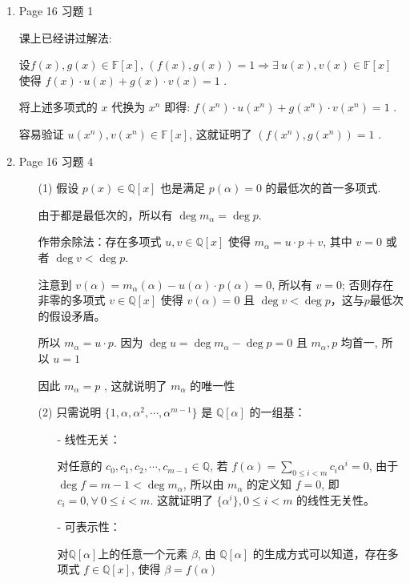 \documentclass{article}
\begin{document}
\begin{spacing}{1.5}
\begin{enumerate}
    \item Page 16 习题 1
    
    课上已经讲过解法: 

    设$f(x), g(x)\in\mathbb{F}[x]$, $(f(x), g(x)) = 1 \Rightarrow \exists\ u(x), v(x)\in\mathbb{F}[x]$ 使得
    $f(x)\cdot u(x) + g(x)\cdot v(x) = 1$ .
    
    将上述多项式的 $x$ 代换为 $x^n$ 即得: $f(x^n)\cdot u(x^n) + g(x^n)\cdot v(x^n) = 1$ .

    容易验证 $u(x^n), v(x^n)\in\mathbb{F}[x]$, 这就证明了 $(f(x^n), g(x^n)) = 1$ .

    \item Page 16 习题 4
    
    \begin{enumerate}
        \item [(1)] 假设 $p(x)\in\mathbb{Q}[x]$ 也是满足 $p(\alpha)=0$ 的最低次的首一多项式.
        
        由于都是最低次的，所以有 $\deg m_\alpha = \deg p$. 
        
        作带余除法：存在多项式 $u, v\in\mathbb{Q}[x]$ 使得 $m_\alpha = u\cdot p + v$,  其中 $v=0$ 或者 $\deg v < \deg p$.

        注意到 $v(\alpha) = m_\alpha(\alpha) - u(\alpha)\cdot p(\alpha) = 0$, 所以有 $v=0$; 否则存在非零的多项式 $v\in\mathbb{Q}[x]$ 使得 $v(\alpha)=0$ 且 $\deg v < \deg p$，这与$p$最低次的假设矛盾。 

        所以 $m_\alpha = u\cdot p$. 因为 $\deg u = \deg m_\alpha - \deg p = 0$ 且 $m_\alpha, p$ 均首一, 所以 $u=1$
        
        因此 $m_\alpha = p$ , 这就说明了 $m_\alpha$ 的唯一性

        \item [(2)] 只需说明 $\{1,\alpha, \alpha^2, \cdots, \alpha^{m-1}\}$ 是 $\mathbb{Q}[\alpha]$ 的一组基：
        \begin{enumerate}
            \item [-] 线性无关：
                
            对任意的 $c_0, c_1, c_2, \cdots, c_{m-1}\in\mathbb{Q}$, 若 $f(\alpha) = \sum_{0\leq i < m} c_i\alpha^i = 0$, 
            由于 $\deg f = m-1 < \deg m_\alpha$, 所以由 $m_\alpha$ 的定义知 $f=0$, 即 $c_i=0,\forall\ 0\leq i < m$. 
            这就证明了 $\{\alpha^i\}, 0\leq i < m$ 的线性无关性。
            
            \item [-] 可表示性：
            
            对$\mathbb{Q}[\alpha]$上的任意一个元素 $\beta$, 由 $\mathbb{Q}[\alpha]$ 的生成方式可以知道，存在多项式 $f\in\mathbb{Q}[x]$, 
            使得 $\beta = f(\alpha)$


\end{enumerate}
\end{enumerate}
\end{enumerate}
\end{spacing}
\end{document}
